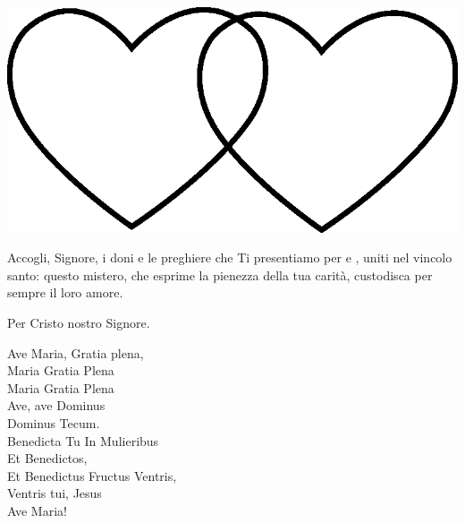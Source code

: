 \documentclass[11pt]{book}
\begin{document}
\consegnanello
%
%
\linebreak
\begin{center}
\includegraphics[scale=0.1]{img/cuori_venn.eps}
\end{center}
\vfill
\pagebreak
{}
\introfedeli
\preghierefedeli
\vfill
\pagebreak


Accogli, Signore, i doni e le preghiere che Ti presentiamo
per \sposa{} e \sposo, uniti nel vincolo
santo: questo mistero, che esprime la pienezza della
tua carità, custodisca per sempre il loro amore. \par\nobreak
Per Cristo nostro Signore.

\settowidth{\versewidth}{Et Benedictus Fructus Ventris,}
\begin{canzone}%
Ave Maria, Gratia plena,\\
Maria Gratia Plena\\
Maria Gratia Plena\\
Ave, ave Dominus\\
Dominus Tecum.\\
Benedicta Tu In Mulieribus\\
Et Benedictos,\\
Et Benedictus Fructus Ventris,\\
Ventris tui, Jesus\\
Ave Maria!\\
\end{canzone}
\end{document}
